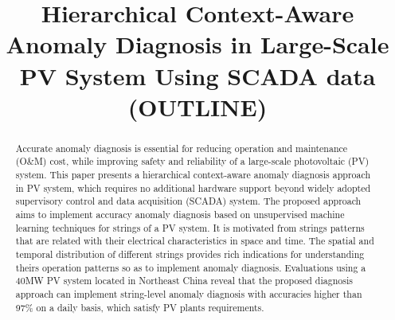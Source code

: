 \documentclass[journal]{IEEEtran}
\begin{document}
\title{Hierarchical Context-Aware Anomaly Diagnosis in Large-Scale PV System Using SCADA data (OUTLINE)}
\maketitle

\begin{abstract}
Accurate anomaly diagnosis is essential for reducing operation and maintenance (O\&M) cost, while improving safety and reliability of a large-scale photovoltaic (PV) system. This paper presents a hierarchical context-aware anomaly diagnosis approach in PV system, which requires no additional hardware support beyond widely adopted supervisory control and data acquisition (SCADA) system. The proposed approach aims to implement accuracy anomaly diagnosis based on unsupervised machine learning techniques for strings of a PV system. It is motivated from strings  patterns that are related with their electrical characteristics in space and time.  The spatial and temporal distribution of different strings provides rich indications for understanding theirs operation patterns so as to implement anomaly diagnosis. Evaluations using a 40MW PV system located in Northeast China reveal that the proposed diagnosis approach can implement string-level anomaly diagnosis with accuracies higher than \textcolor[rgb]{1,0,0}{97\%} on a daily basis, which satisfy PV plants requirements.
\end{abstract}
\end{document}
